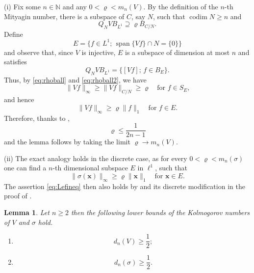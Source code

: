 \documentclass[10pt,reqno]{amsart}
\def\N{\mathbb{N}}
\def\codim{\operatorname{codim}}
\def\spn{\operatorname{span}}
\newtheorem{lemma}[theorem]{Lemma}
\numberwithin{equation}{section}
\let\oldendproof\endproof
\renewenvironment{proof}[1][\proofname]{%
  \oldproof[\bf #1]%
}{\oldendproof}
\def\Li{{L^1}}
\def\Linf{{C}}
\def\vx{\mathbf{x}}
\begin{document}
\begin{proof}
(i)
Fix some $n\in\N$ and any $0<\varrho<m_n(V)$. By the definition of the $n$-th Mityagin number,
there is a subspace of $\Linf$, say $N$, such that $\codim N \ge n$ and
\begin{equation} \label{eq:rhoball}
	Q_N V B_{\Li} \supseteq \varrho B_{\Linf/N}.
\end{equation}
Define
\begin{equation*}
	E = \bigl\{ f\in \Li;\, \spn\{Vf\}\cap N = \{0\} \bigr\}
\end{equation*}
and observe that, since $V$ is injective, $E$ is a subspace of dimension at most $n$
and satisfies
\begin{equation} \label{eq:rhoball2}
	Q_N V B_{\Li} = \bigl\{ [Vf];\, f\in B_E \bigr\}.
\end{equation}
Thus, by \eqref{eq:rhoball} and \eqref{eq:rhoball2}, we have
\begin{equation*}
	\|Vf\|_{\infty} \ge \|Vf\|_{\Linf/N} \ge \varrho
	\quad\text{for $f\in S_E$,}
\end{equation*}
and hence
\begin{equation*}
	\|Vf\|_{\infty} \ge \varrho \|f\|_1
	\quad\text{for $f\in E$.}
\end{equation*}
Therefore, thanks to \citep[Lemma~2.4]{Lef17},
\begin{equation} \label{eq:Lefineq}
	\varrho \le \frac{1}{2n-1}
\end{equation}
and the lemma follows by taking the limit $\varrho\to m_n(V)$.

(ii) The exact analogy holds in the discrete case, as
for every $0<\varrho<m_n(\sigma)$ one can find a $n$-th dimensional
subspace $E$ in $\ell^1$, such that
\begin{equation*}
	\|\sigma(\vx)\|_\infty \ge \varrho \|\vx\|_1
	\quad\text{for $\vx\in E$}.
\end{equation*}
The assertion \eqref{eq:Lefineq} then also holds by \citep[Lemma~2.4]{Lef17}
and its discrete modification in the proof of \citep[Theorem~3.2]{Lef17}.
\end{proof}

\begin{lemma} \label{lemm:Kolmogorov}
Let $n\ge 2$ then the following lower bounds of the Kolmogorov numbers of $V$ and $\sigma$ hold.
\begin{enumerate}[\rm (i)]
\item 
\begin{equation*}
	d_n(V) \ge \frac{1}{2};
\end{equation*}
\item 
\begin{equation*}
	d_n(\sigma) \ge \frac{1}{2}.
\end{equation*}
\end{enumerate}
\end{lemma}
\end{document}
